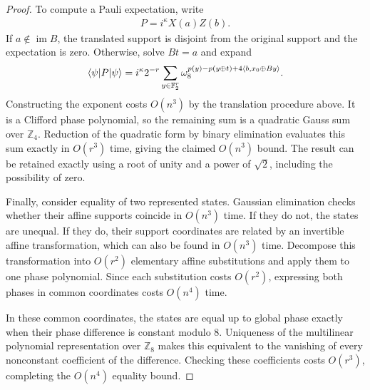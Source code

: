 \begin{proof}
To compute a Pauli expectation, write
\begin{align}
    P=i^\kappa X(a)Z(b).
\end{align}
If $a\notin\operatorname{im}B$, the translated support is disjoint from the original support and the expectation is zero.
Otherwise, solve $Bt=a$ and expand
\begin{align}
    \bra{\psi}P\ket{\psi}
    =i^\kappa 2^{-r}
    \sum_{y\in\mathbb{F}_2^r}
    \omega_8^{p(y)-p(y\oplus t)
    +4\langle b,x_0\oplus By\rangle}.
    \label{eq:pauli-expectation-gauss-sum}
\end{align}
Constructing the exponent costs $O(n^3)$ by the translation procedure above.
It is a Clifford phase polynomial, so the remaining sum is a quadratic Gauss sum over $\mathbb{Z}_4$.
Reduction of the quadratic form by binary elimination evaluates this sum exactly in $O(r^3)$ time, giving the claimed $O(n^3)$ bound.
The result can be retained exactly using a root of unity and a power of $\sqrt{2}$, including the possibility of zero.

Finally, consider equality of two represented states.
Gaussian elimination checks whether their affine supports coincide in $O(n^3)$ time.
If they do not, the states are unequal.
If they do, their support coordinates are related by an invertible affine transformation, which can also be found in $O(n^3)$ time.
Decompose this transformation into $O(r^2)$ elementary affine substitutions and apply them to one phase polynomial.
Since each substitution costs $O(r^2)$, expressing both phases in common coordinates costs $O(n^4)$ time.

In these common coordinates, the states are equal up to global phase exactly when their phase difference is constant modulo $8$.
Uniqueness of the multilinear polynomial representation over $\mathbb{Z}_8$ makes this equivalent to the vanishing of every nonconstant coefficient of the difference.
Checking these coefficients costs $O(r^3)$, completing the $O(n^4)$ equality bound.
\end{proof}
